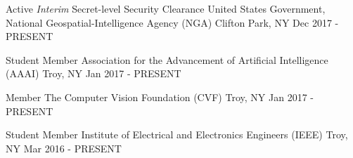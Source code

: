 

\begin{cventries}


  \cventryshort
    {Active \textit{Interim} Secret-level Security Clearance} %
    {United States Government, National Geospatial-Intelligence Agency (NGA)} %
    {Clifton Park, NY} %
    {Dec 2017 - PRESENT} %

  \cventryshort
    {Student Member} %
    {Association for the Advancement of Artificial Intelligence (AAAI)} %
    {Troy, NY} %
    {Jan 2017 - PRESENT} %

  \cventryshort
    {Member} %
    {The Computer Vision Foundation (CVF)} %
    {Troy, NY} %
    {Jan 2017 - PRESENT} %

  \cventryshort
    {Student Member} %
    {Institute of Electrical and Electronics Engineers (IEEE)} %
    {Troy, NY} %
    {Mar 2016 - PRESENT} %




\end{cventries}

